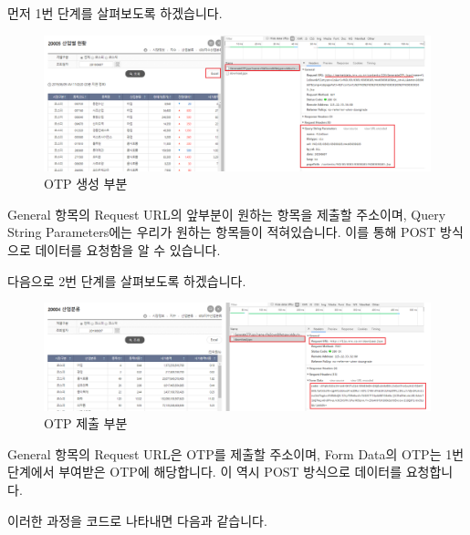 \documentclass[]{book}
\begin{document}
먼저 1번 단계를 살펴보도록 하겠습니다.

\begin{figure}

{\centering \includegraphics[width=1\linewidth]{images/crawl_practice_krx_sector} 

}

\caption{OTP 생성 부분}\label{fig:unnamed-chunk-1}
\end{figure}

General 항목의 Request URL의 앞부분이 원하는 항목을 제출할 주소이며, Query String Parameters에는 우리가 원하는 항목들이 적혀있습니다. 이를 통해 POST 방식으로 데이터를 요청함을 알 수 있습니다.

다음으로 2번 단계를 살펴보도록 하겠습니다.

\begin{figure}

{\centering \includegraphics[width=1\linewidth]{images/crawl_practice_krx_sector2} 

}

\caption{OTP 제출 부분}\label{fig:unnamed-chunk-2}
\end{figure}

General 항목의 Request URL은 OTP를 제출할 주소이며, Form Data의 OTP는 1번 단계에서 부여받은 OTP에 해당합니다. 이 역시 POST 방식으로 데이터를 요청합니다.

이러한 과정을 코드로 나타내면 다음과 같습니다.
\end{document}

